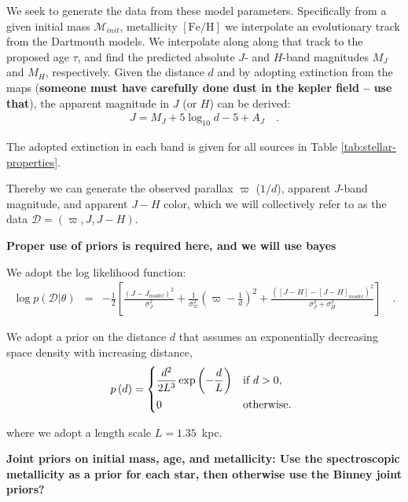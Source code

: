\documentclass[preprint]{aastex}
\newcommand{\feh}{[\mathrm{Fe/H}]}
\newcommand{\parallax}{\varpi}
\newcommand{\mass}{\mathcal{M}}
\newcommand{\given}{|}
\newcommand{\data}{\mathcal{D}}
\begin{document}
We seek to generate the data from these model parameters. Specifically from a given initial mass $\mass_{init}$, metallicity $\feh$ we interpolate an evolutionary track from the Dartmouth models.  We interpolate along along that track to the proposed age $\tau$, and find the predicted absolute $J$- and $H$-band magnitudes $M_J$ and $M_H$, respectively.  Given the distance $d$ and by adopting extinction from the \citet{Schlegel} maps (\textbf{someone must have carefully done dust in the kepler field -- use that}), the apparent magnitude in $J$ (or $H$) can be derived: 
\begin{eqnarray}
    J = M_J + 5\log_{10}d - 5 + A_J \quad .
\end{eqnarray}

The adopted extinction in each band is given for all sources in Table \ref{tab:stellar-properties}.


Thereby we can generate the observed parallax $\parallax$ ($1/d$), apparent $J$-band magnitude, and apparent $J - H$ color, which we will collectively refer to as the data $\data = (\parallax, J, J-H)$. 

\textbf{Proper use of priors is required here, and we will use bayes}


We adopt the log likelihood function:
\begin{eqnarray}\label{eq:likelihood-function}
    \log{p\left(\data\given\theta\right)} & = & -\frac{1}{2}\left[\frac{(J-J_{model})^2}{\sigma_{J}^2} + \frac{1}{\sigma_\parallax^2}\left(\parallax - \frac{1}{d}\right)^2 + \frac{\left([J-H] - [J-H]_{model}\right)^2}{\sigma_J^2 + \sigma_H^2}\right] \quad . 
\end{eqnarray}


We adopt a prior on the distance $d$ that assumes an exponentially decreasing space density with increasing distance,
\begin{eqnarray}
    p\left(d\right) = \begin{dcases*}
        \frac{d^2}{2L^3}\exp{\left(-\frac{d}{L}\right)} & if $d > 0$,\\
        0 & otherwise.
    \end{dcases*}
\end{eqnarray}

\noindent{}where we adopt a length scale $L = 1.35$~kpc.

\textbf{Joint priors on initial mass, age, and metallicity: Use the spectroscopic metallicity as a prior for each star, then otherwise use the Binney joint priors?}
\end{document}
